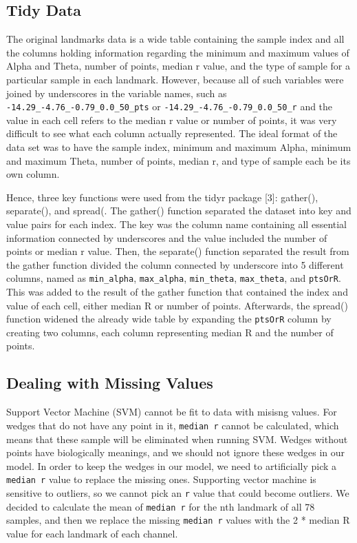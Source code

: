 \documentclass[10pt,letterpaper]{article}
\begin{document}
\subsection{Tidy Data}\label{tidy-data}

The original landmarks data is a wide table containing the sample index
and all the columns holding information regarding the minimum and
maximum values of Alpha and Theta, number of points, median r value, and
the type of sample for a particular sample in each landmark. However,
because all of such variables were joined by underscores in the variable
names, such as \texttt{-14.29\_-4.76\_-0.79\_0.0\_50\_pts} or
\texttt{-14.29\_-4.76\_-0.79\_0.0\_50\_r} and the value in each cell
refers to the median r value or number of points, it was very difficult
to see what each column actually represented. The ideal format of the
data set was to have the sample index, minimum and maximum Alpha,
minimum and maximum Theta, number of points, median r, and type of
sample each be its own column.

Hence, three key functions were used from the tidyr package {[}3{]}:
gather(), separate(), and spread(. The gather() function separated the
dataset into key and value pairs for each index. The key was the column
name containing all essential information connected by underscores and
the value included the number of points or median r value. Then, the
separate() function separated the result from the gather function
divided the column connected by underscore into 5 different columns,
named as \texttt{min\_alpha}, \texttt{max\_alpha}, \texttt{min\_theta},
\texttt{max\_theta}, and \texttt{ptsOrR}. This was added to the result
of the gather function that contained the index and value of each cell,
either median R or number of points. Afterwards, the spread() function
widened the already wide table by expanding the \texttt{ptsOrR} column
by creating two columns, each column representing median R and the
number of points.

\subsection{Dealing with Missing
Values}\label{dealing-with-missing-values}

Support Vector Machine (SVM) cannot be fit to data with misisng values.
For wedges that do not have any point in it, \texttt{median\ r} cannot
be calculated, which means that these sample will be eliminated when
running SVM. Wedges without points have biologically meanings, and we
should not ignore these wedges in our model. In order to keep the wedges
in our model, we need to artificially pick a \texttt{median\ r} value to
replace the missing ones. Supporting vector machine is sensitive to
outliers, so we cannot pick an \texttt{r} value that could become
outliers. We decided to calculate the mean of \texttt{median\ r} for the
nth landmark of all 78 samples, and then we replace the missing
\texttt{median\ r} values with the 2 * median R value for each landmark
of each channel.
\end{document}
